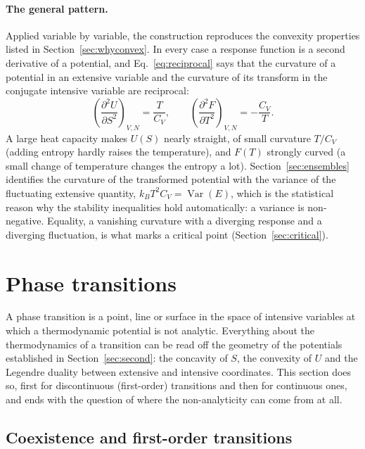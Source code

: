 \documentclass[10pt,a4paper]{article}
\theoremstyle{remark}
\newcommand{\Var}{\operatorname{Var}}
\begin{document}
\paragraph{The general pattern.} Applied variable by variable, the construction
reproduces the convexity properties listed in Section~\ref{sec:whyconvex}. In every case a response function is a second
derivative of a potential, and Eq.~\eqref{eq:reciprocal} says that the
curvature of a potential in an extensive variable and the curvature of its
transform in the conjugate intensive variable are reciprocal:
\[
  \left(\frac{\partial^{2}U}{\partial S^{2}}\right)_{V,N}=\frac{T}{C_V},
  \qquad
  \left(\frac{\partial^{2}F}{\partial T^{2}}\right)_{V,N}=-\frac{C_V}{T} .
\]
A large heat capacity makes $U(S)$ nearly straight, of small curvature
$T/C_V$ (adding entropy hardly raises the temperature), and $F(T)$ strongly curved (a small change of temperature
changes the entropy a lot). Section~\ref{sec:ensembles} identifies the
curvature of the transformed potential with the variance of the fluctuating
extensive quantity, $k_BT^{2}C_V=\Var(E)$, which is the statistical reason why
the stability inequalities hold automatically: a variance is non-negative.
Equality, a vanishing curvature with a diverging response and a diverging
fluctuation, is what marks a critical point (Section~\ref{sec:critical}).

\section{Phase transitions}
\label{sec:transitions}

A phase transition is a point, line or surface in the space of intensive
variables at which a thermodynamic potential is not analytic. Everything about
the thermodynamics of a transition can be read off the geometry of the
potentials established in Section~\ref{sec:second}: the concavity of $S$, the
convexity of $U$ and the Legendre duality between extensive and intensive
coordinates. This section does so, first for discontinuous (first-order)
transitions and then for continuous ones, and ends with the question of where
the non-analyticity can come from at all.

\subsection{Coexistence and first-order transitions}
\label{sec:firsttransition}
\end{document}
